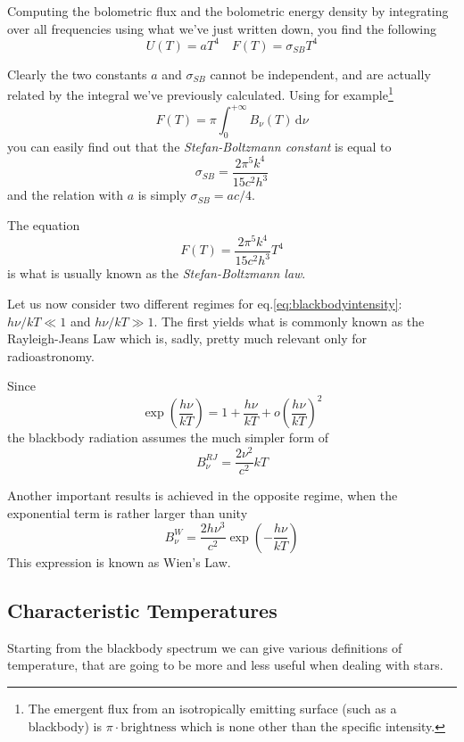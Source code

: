 \par Computing the bolometric flux and the bolometric energy density by integrating over all frequencies using what we've just written down, you find the following 
\begin{equation*}
	U(T) = aT^{4} \quad F(T) = \sigma_{SB}T^{4}
\end{equation*}
\par Clearly the two constants $a$ and $\sigma_{SB}$ cannot be independent, and are actually related by the integral we've previously calculated. Using for example\footnote{The emergent flux from an isotropically emitting surface (such as a blackbody) is $\pi\cdot \text{brightness}$ which is none other than the specific intensity.}
\begin{equation*}
	F(T) = \pi \int_{0}^{+\infty} B_{\nu}(T)\,\text{d}\nu
\end{equation*}
you can easily find out that the \emph{Stefan-Boltzmann constant} is equal to $$ \sigma_{SB} = \frac{2\pi^{5}k^{4}}{15c^{2}h^{3}}$$
and the relation with $a$ is simply $\sigma_{SB} = ac/4$.
\par The equation 
\begin{equation}
	F(T) = \frac{2\pi^{5}k^{4}}{15c^{2}h^{3}} T^{4}
	\label{eq:SB}
\end{equation}
is what is usually known as the \emph{Stefan-Boltzmann law}.
\par Let us now consider two different regimes for eq.\ref{eq:blackbodyintensity}: $h\nu/kT \ll 1$ and $h\nu/kT \gg 1$. The first yields what is commonly known as the Rayleigh-Jeans Law which is, sadly, pretty much relevant only for radioastronomy.
\par Since 
\begin{equation*}
	\exp\left(\frac{h\nu}{kT}\right) = 1+\frac{h\nu}{kT}+o\left(\frac{h\nu}{kT}\right)^{2}
\end{equation*} 
the blackbody radiation assumes the much simpler form of
\begin{equation*}
	B_{\nu}^{RJ} = \frac{2\nu^{2}}{c^{2}}kT
\end{equation*}
\par Another important results is achieved in the opposite regime, when the exponential term is rather larger than unity
\begin{equation*}
	B_{\nu}^{W} = \frac{2h\nu^{3}}{c^{2}}\exp\left(-\frac{h\nu}{kT}\right)
\end{equation*}
This expression is known as Wien's Law.

\subsection{Characteristic Temperatures}
Starting from the blackbody spectrum we can give various definitions of temperature, that are going to be more and less useful when dealing with stars.

